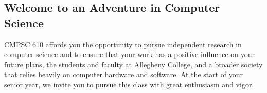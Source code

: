 \vspace*{-.1in}
\subsection*{Welcome to an Adventure in Computer Science}

CMPSC 610 affords you the opportunity to pursue independent research in computer science and to ensure that your work
has a positive influence on your future plans, the students and faculty at Allegheny College, and a broader society that
relies heavily on computer hardware and software.  At the start of your senior year, we invite you to pursue this class
with great enthusiasm and vigor.


